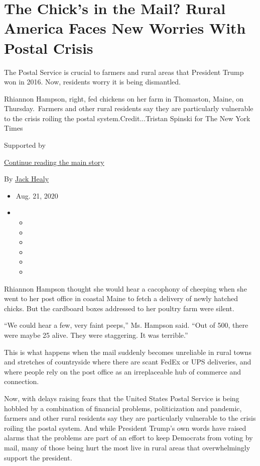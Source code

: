 \hypertarget{the-chicks-in-the-mail-rural-america-faces-new-worries-with-postal-crisis}{%
\section{The Chick's in the Mail? Rural America Faces New Worries With
Postal
Crisis}\label{the-chicks-in-the-mail-rural-america-faces-new-worries-with-postal-crisis}}

The Postal Service is crucial to farmers and rural areas that President
Trump won in 2016. Now, residents worry it is being dismantled.

Rhiannon Hampson, right, fed chickens on her farm in Thomaston, Maine,
on Thursday.~Farmers and other rural residents say they are particularly
vulnerable to the crisis roiling the postal system.Credit...Tristan
Spinski for The New York Times

Supported by

\protect\hyperlink{after-sponsor}{Continue reading the main story}

By \href{https://www.nytimes3xbfgragh.onion/by/jack-healy}{Jack Healy}

\begin{itemize}
\item
  Aug. 21, 2020
\item
  \begin{itemize}
  \item
  \item
  \item
  \item
  \item
  \item
  \end{itemize}
\end{itemize}

Rhiannon Hampson thought she would hear a cacophony of cheeping when she
went to her post office in coastal Maine to fetch a delivery of newly
hatched chicks. But the cardboard boxes addressed to her poultry farm
were silent.

``We could hear a few, very faint peeps,'' Ms. Hampson said. ``Out of
500, there were maybe 25 alive. They were staggering. It was terrible.''

This is what happens when the mail suddenly becomes unreliable in rural
towns and stretches of countryside where there are scant FedEx or UPS
deliveries, and where people rely on the post office as an irreplaceable
hub of commerce and connection.

Now, with delays raising fears that the United States Postal Service is
being hobbled by a combination of financial problems, politicization and
pandemic, farmers and other rural residents say they are particularly
vulnerable to the crisis roiling the postal system. And while President
Trump's own words have raised alarms that the problems are part of an
effort to keep Democrats from voting by mail, many of those being hurt
the most live in rural areas that overwhelmingly support the president.

